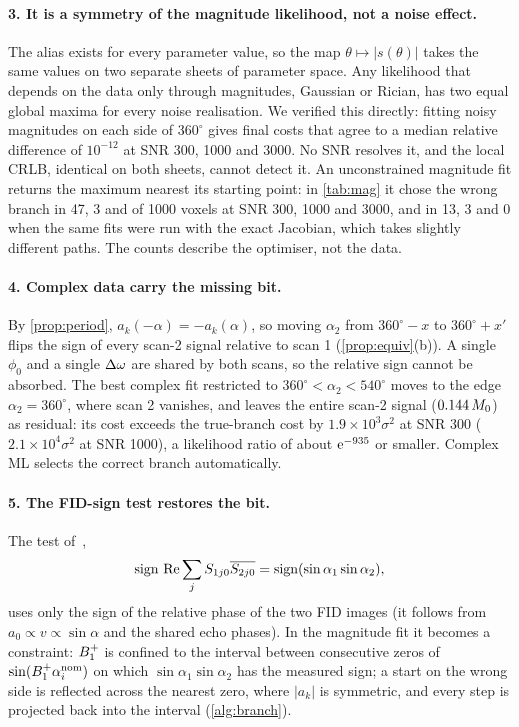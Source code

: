 \paragraph{3. It is a symmetry of the magnitude likelihood, not a noise effect.} The alias
exists for every parameter value, so the map $\theta\mapsto|s(\theta)|$ takes the same values on two
separate sheets of parameter space. Any likelihood that depends on the data only through
magnitudes, Gaussian or Rician, has two equal global maxima for every noise realisation. We
verified this directly: fitting noisy magnitudes on each side of $360^\circ$ gives final costs
that agree to a median relative difference of $10^{-12}$ at SNR 300, 1000 and 3000. No SNR
resolves it, and the local CRLB, identical on both sheets, cannot detect it. An
unconstrained magnitude fit returns the maximum nearest its starting point: in
\cref{tab:mag} it chose the wrong branch in 47, 3 and \MagWrongThree{} of 1000 voxels at SNR
300, 1000 and 3000, and in 13, 3 and 0 when the same fits were run with the exact Jacobian,
which takes slightly different paths. The counts describe the optimiser, not the data.

\paragraph{4. Complex data carry the missing bit.} By \cref{prop:period},
$a_k(-\alpha)=-a_k(\alpha)$, so moving $\alpha_2$ from $360^\circ-x$ to $360^\circ+x'$ flips the sign of every
scan-2 signal relative to scan 1 (\cref{prop:equiv}(b)). A single $\phi_0$ and a single $\Delta\omega$ are
shared by both scans, so the relative sign cannot be absorbed. The best complex fit
restricted to $360^\circ<\alpha_2<540^\circ$ moves to the edge $\alpha_2=360^\circ$, where scan 2 vanishes, and
leaves the entire scan-2 signal ($0.144\,M_0$) as residual: its cost exceeds the true-branch
cost by $1.9\times10^3\sigma^2$ at SNR 300 ($2.1\times10^4\sigma^2$ at SNR 1000), a likelihood ratio of about
$\mathrm{e}^{-935}$ or smaller. Complex ML selects the correct branch automatically.

\paragraph{5. The FID-sign test restores the bit.} The test of~\cite{cheng2019},
\begin{equation}
  \operatorname{sign}\,\operatorname{Re}\sum_jS_{1j0}\overline{S_{2j0}}=\operatorname{sign}(\sin\alpha_1\sin\alpha_2),
  \label{eq:fidsign}
\end{equation}
uses only the sign of the relative phase of the two FID images (it follows from
$a_0\propto v\propto\sin\alpha$ and the shared echo phases). In the magnitude fit it becomes a
constraint: $B_1^{+}$ is confined to the interval between consecutive zeros of
$\sin(B_1^{+}\alpha_i^{\rm nom})$ on which $\sin\alpha_1\sin\alpha_2$ has the measured sign; a start on the wrong
side is reflected across the nearest zero, where $|a_k|$ is symmetric, and every step is
projected back into the interval (\cref{alg:branch}).

